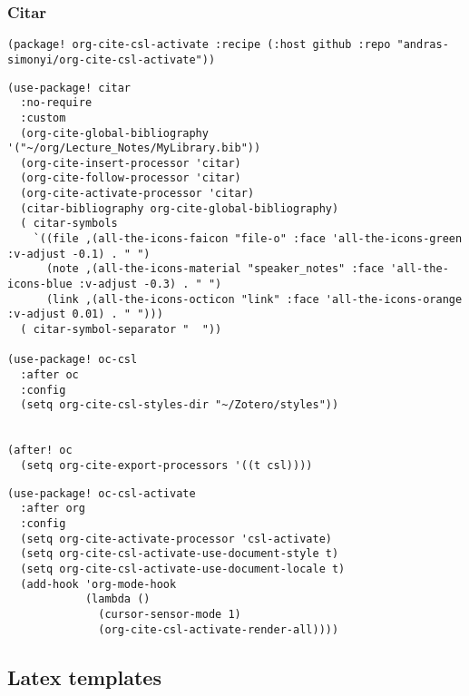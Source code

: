 \documentclass[c]{article}
\theoremstyle{plain}%
\theoremstyle{definition}
\theoremstyle{remark}
\begin{document}
\subsubsection{Citar}
\label{sec:org5a4189e}
\begin{verbatim}
(package! org-cite-csl-activate :recipe (:host github :repo "andras-simonyi/org-cite-csl-activate"))
\end{verbatim}
\begin{verbatim}
(use-package! citar
  :no-require
  :custom
  (org-cite-global-bibliography '("~/org/Lecture_Notes/MyLibrary.bib"))
  (org-cite-insert-processor 'citar)
  (org-cite-follow-processor 'citar)
  (org-cite-activate-processor 'citar)
  (citar-bibliography org-cite-global-bibliography)
  ( citar-symbols
    `((file ,(all-the-icons-faicon "file-o" :face 'all-the-icons-green :v-adjust -0.1) . " ")
      (note ,(all-the-icons-material "speaker_notes" :face 'all-the-icons-blue :v-adjust -0.3) . " ")
      (link ,(all-the-icons-octicon "link" :face 'all-the-icons-orange :v-adjust 0.01) . " ")))
  ( citar-symbol-separator "  "))

(use-package! oc-csl
  :after oc
  :config
  (setq org-cite-csl-styles-dir "~/Zotero/styles"))


(after! oc
  (setq org-cite-export-processors '((t csl))))
\end{verbatim}
\begin{verbatim}
(use-package! oc-csl-activate
  :after org
  :config
  (setq org-cite-activate-processor 'csl-activate)
  (setq org-cite-csl-activate-use-document-style t)
  (setq org-cite-csl-activate-use-document-locale t)
  (add-hook 'org-mode-hook
            (lambda ()
              (cursor-sensor-mode 1)
              (org-cite-csl-activate-render-all))))
\end{verbatim}
\subsection{Latex templates}
\label{sec:orgfddf0d1}
\end{document}
